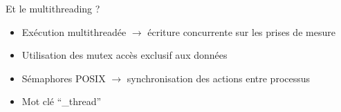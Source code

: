 \documentclass{beamer}
\begin{document}
\begin{frame}{Et le multithreading ?}
  \begin{itemize}
  \item Exécution multithreadée $\rightarrow$ écriture concurrente sur les prises de mesure
  \item Utilisation des mutex accès exclusif aux données
  \item Sémaphores POSIX $\rightarrow$ synchronisation des actions entre processus
  \item Mot clé ``\_thread''
  \end{itemize}
\end{frame}
\end{document}
